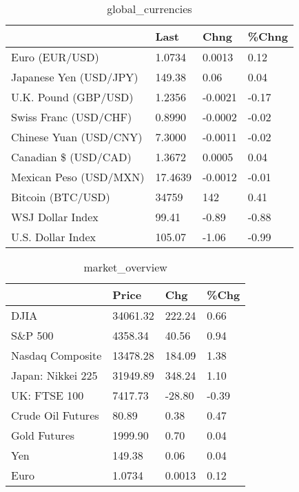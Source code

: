 \documentclass{article}%
\begin{document}
%


\begin{table}[htbp]%
\caption{global\_currencies}%
\centering%
\begin{adjustbox}{width=1\textwidth}%
\begin{tabular}{llll}
\toprule
                       &    Last &    Chng & \%Chng \\
\midrule
        Euro (EUR/USD) &  1.0734 &  0.0013 &  0.12 \\
Japanese Yen (USD/JPY) &  149.38 &    0.06 &  0.04 \\
  U.K. Pound (GBP/USD) &  1.2356 & -0.0021 & -0.17 \\
 Swiss Franc (USD/CHF) &  0.8990 & -0.0002 & -0.02 \\
Chinese Yuan (USD/CNY) &  7.3000 & -0.0011 & -0.02 \\
  Canadian \$ (USD/CAD) &  1.3672 &  0.0005 &  0.04 \\
Mexican Peso (USD/MXN) & 17.4639 & -0.0012 & -0.01 \\
     Bitcoin (BTC/USD) &   34759 &     142 &  0.41 \\
      WSJ Dollar Index &   99.41 &   -0.89 & -0.88 \\
     U.S. Dollar Index &  105.07 &   -1.06 & -0.99 \\
\bottomrule
\end{tabular}
%
\end{adjustbox}%
\end{table}

%


\begin{table}[htbp]%
\caption{market\_overview}%
\centering%
\begin{adjustbox}{width=1\textwidth}%
\begin{tabular}{llll}
\toprule
                  &    Price &    Chg &  \%Chg \\
\midrule
             DJIA & 34061.32 & 222.24 &  0.66 \\
          S\&P 500 &  4358.34 &  40.56 &  0.94 \\
 Nasdaq Composite & 13478.28 & 184.09 &  1.38 \\
Japan: Nikkei 225 & 31949.89 & 348.24 &  1.10 \\
     UK: FTSE 100 &  7417.73 & -28.80 & -0.39 \\
Crude Oil Futures &    80.89 &   0.38 &  0.47 \\
     Gold Futures &  1999.90 &   0.70 &  0.04 \\
              Yen &   149.38 &   0.06 &  0.04 \\
             Euro &   1.0734 & 0.0013 &  0.12 \\
\bottomrule
\end{tabular}
%
\end{adjustbox}%
\end{table}

%
\end{document}
